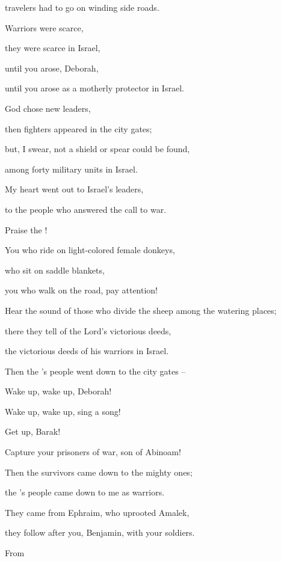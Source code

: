 {\par }{\Q travelers had to go
on winding
side roads.
\par }{\Q {}Warriors
were scarce,
\par }{\Q they were scarce
in Israel,
\par }{\Q until
you arose,
Deborah,
\par }{\Q until you arose
as a motherly
protector in Israel.
\par }{\Q {}God
chose
new
leaders,

\par }{\Q then
fighters
appeared
in the city gates;
\par }{\Q but, I swear, not a shield
or
spear
could be found,

\par }{\Q among forty
military units in Israel.
\par }{\Q {}My heart
went out
to Israel’s
leaders,
\par }{\Q to the people
who answered the call to war.
\par }{\Q Praise
the {}!
\par }{\Q {}You who ride
on light-colored
female donkeys,
\par }{\Q who sit
on
saddle blankets,
\par }{\Q you who walk
on
the road,
pay attention!
\par }{\Q {}Hear the sound
of those who divide the sheep
among
the watering places;
\par }{\Q there
they tell
of the Lord’s
victorious deeds,
\par }{\Q the victorious deeds
of his warriors
in Israel.
\par }{\Q Then
the
{}’s
people
went down
to the city gates –
\par }{\Q {}Wake up,
wake up,
Deborah!
\par }{\Q Wake up,
wake up,
sing
a song!
\par }{\Q Get up,
Barak!
\par }{\Q Capture
your prisoners
of war, son
of Abinoam!
\par }{\Q {}Then
the survivors
came down
to the mighty ones;
\par }{\Q the
{}’s
people
came down
to me as warriors.
\par }{\Q {}They came from
Ephraim,
who uprooted
Amalek,
\par }{\Q they follow
after you, Benjamin,
with your soldiers.
\par }{\Q From
}
